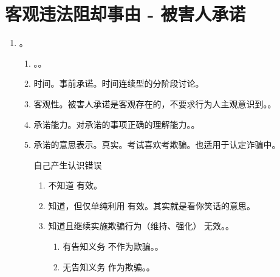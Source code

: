 \section{客观违法阻却事由 - 被害人承诺}
\begin{enumerate}
  \item {}。
        \begin{enumerate}
          \item {}。。
          \item 时间。事前承诺。时间连续型的分阶段讨论。
          \item 客观性。被害人承诺是客观存在的，不要求行为人主观意识到。。
          \item 承诺能力。对承诺的事项正确的理解能力。。
          \item 承诺的意思表示。真实。考试喜欢考欺骗。也适用于认定诈骗中。
                \begin{kk}{自己产生认识错误}
                  \begin{enumerate}
                    \item 不知道 \yjt 有效。
                    \item 知道，但仅单纯利用 \yjt 有效。其实就是看你笑话的意思。
                    \item 知道且继续实施欺骗行为（维持、强化） \yjt 无效。。
                          \begin{enumerate}
                            \item 有告知义务 \yjt 不作为欺骗。。
                            \item 无告知义务 \yjt 作为欺骗。。
                          \end{enumerate}
                  \end{enumerate}
                \end{kk}


\end{enumerate}
\end{enumerate}

